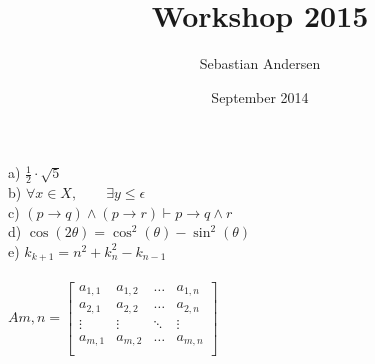 \documentclass{article}
\title{Workshop 2015}
\author{Sebastian Andersen}
\date{September 2014}
\newcommand{\Fin}{
\vfill
\begin{center}
\textit{}\label{FIN}
\end{center}}
\begin{document}
a) $\frac{1}{2} \cdot \sqrt{5}$\\
b) $\forall{x} \in X, \hspace{2em} \exists{y \leq \epsilon}$\\
c) $(p \to q) \land (p \to r) \vdash p \to q \land r$\\
d) $\cos(2 \theta) = \cos^2(\theta) - \sin^2(\theta)$\\
e) $k_{k+1} = n^2 + k^2_n - k_{n-1}$\\\\
$Am,n =
\begin{bmatrix}
  a_{1,1} & a_{1,2} & \hdots & a_{1,n}\\
  a_{2,1} & a_{2,2} & \hdots & a_{2,n}\\
  \vdots & \vdots & \ddots & \vdots\\
  a_{m,1} & a_{m,2} & \hdots & a_{m,n}\\
\end{bmatrix}
$

%


\Fin
\end{document}
